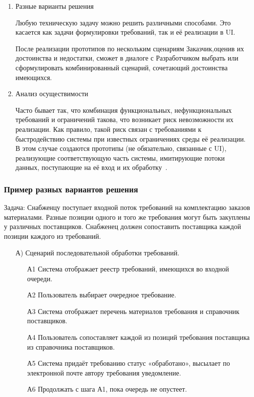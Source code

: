 \documentclass{../industrial-development}
\begin{document}
{\begin{enumerate}
\item \alert{Разные варианты решения}

Любую техническую задачу можно решить
различными способами. Это касается как задачи формулировки требований, так и её
реализации в UI.

После реализации прототипов по нескольким сценариям Заказчик,оценив их достоинства
и недостатки, сможет в диалоге с Разработчиком выбрать или сформулировать комбинированный сценарий, сочетающий достоинства имеющихся.

\item \alert{Анализ осуществимости}

Часто бывает так, что комбинация функциональных,
нефункциональных требований и ограничений такова, что возникает риск невозможности
их реализации. Как правило, такой риск связан с требованиями к быстродействию
системы при известных ограничениях среды её реализации. В этом случае создаются
прототипы (не обязательно, связанные с UI), реализующие соответствующую часть
системы, имитирующие потоки данных, поступающие на её вход и их обработку~\cite[с.~51-52]{Maglinec}.

\end{enumerate}

\begin{frame} \frametitle {Пример разных вариантов решения}
\alert{Задача}: Снабженцу поступает входной поток требований на
комплектацию заказов материалами. Разные позиции одного и того же требования могут
быть закуплены у различных поставщиков. Снабженец должен сопоставить поставщика
каждой позиции каждого из требований.

\begin{itemize}
\item[А)] Сценарий последовательной обработки требований.
\begin{itemize}
\item[А1] Система отображает реестр требований, имеющихся во входной очереди.
\item[А2] Пользователь выбирает очередное требование.
\item[А3] Система отображает перечень материалов требования и справочник
поставщиков.
\item[А4] Пользователь сопоставляет каждой из позиций требования поставщика из
справочника поставщиков.
\item[А5] Система придаёт требованию статус «обработано», высылает по электронной
почте автору требования уведомление.
\item[А6] Продолжать с шага А1, пока очередь не опустеет.
\end{itemize}
\end{itemize}
\end{frame}

}
\end{document}
